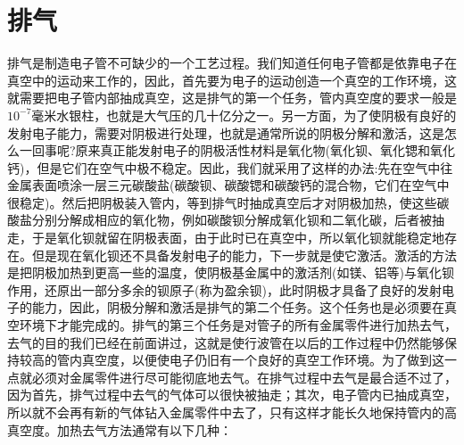 \section{排气}
排气是制造电子管不可缺少的一个工艺过程。我们知道任何电子管都是依靠电子在真空中的运动来工作的，因此，首先要为电子的运动创造一个真空的工作环境，这就需要把电子管内部抽成真空，这是排气的第一个任务，管内真空度的要求一般是$ 10^{-7} $毫米水银柱，也就是大气压的几十亿分之一。另一方面，为了使阴极有良好的发射电子能力，需要对阴极进行处理，也就是通常所说的阴极分解和激活，这是怎么一回事呢?原来真正能发射电子的阴极活性材料是氧化物(氧化钡、氧化锶和氧化钙)，但是它们在空气中极不稳定。因此，我们就采用了这样的办法:先在空气中往金属表面喷涂一层三元碳酸盐(碳酸钡、碳酸锶和碳酸钙的混合物，它们在空气中很稳定)。然后把阴极装入管内，等到排气时抽成真空后才对阴极加热，使这些碳酸盐分别分解成相应的氧化物，例如碳酸钡分解成氧化钡和二氧化碳，后者被抽走，于是氧化钡就留在阴极表面，由于此时已在真空中，所以氧化钡就能稳定地存在。但是现在氧化钡还不具备发射电子的能力，下一步就是使它激活。激活的方法是把阴极加热到更高一些的温度，使阴极基金属中的激活剂(如镁、铝等)与氧化钡作用，还原出一部分多余的钡原子(称为盈余钡)，此时阴极才具备了良好的发射电子的能力，因此，阴极分解和激活是排气的第二个任务。这个任务也是必须要在真空环境下才能完成的。排气的第三个任务是对管子的所有金属零件进行加热去气，去气的目的我们已经在前面讲过，这就是使行波管在以后的工作过程中仍然能够保持较高的管内真空度，以便使电子仍旧有一个良好的真空工作环境。为了做到这一点就必须对金属零件进行尽可能彻底地去气。在排气过程中去气是最合适不过了，因为首先，排气过程中去气的气体可以很快被抽走；其次，电子管内已抽成真空，所以就不会再有新的气体钻入金属零件中去了，只有这样才能长久地保持管内的高真空度。加热去气方法通常有以下几种：

